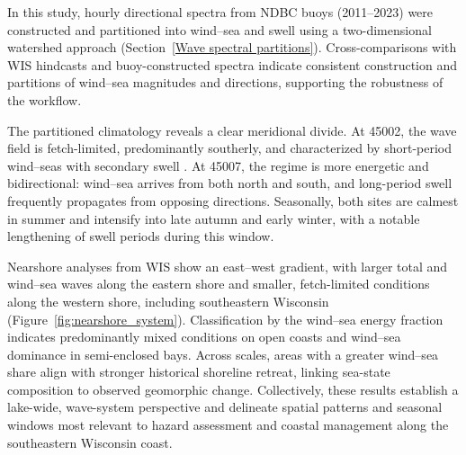 In this study, hourly directional spectra from NDBC buoys (2011–2023) were
constructed and partitioned into wind–sea and swell using a two-dimensional
watershed approach (Section~\ref{Wave spectral partitions}). Cross-comparisons
with WIS hindcasts and buoy-constructed spectra indicate consistent construction
and partitions of wind–sea magnitudes and directions, supporting the robustness
of the workflow.

The partitioned climatology reveals a clear meridional divide. At 45002, the
wave field is fetch-limited, predominantly southerly, and characterized by
short-period wind–seas with secondary swell . At 45007, the regime is more energetic and
bidirectional: wind–sea arrives from both north and south, and long-period swell
frequently propagates from opposing directions. Seasonally,
both sites are calmest in summer and intensify into late autumn and early
winter, with a notable lengthening of swell periods during this window.

Nearshore analyses from WIS show an east–west gradient, with larger total and
wind–sea waves along the eastern shore and smaller, fetch-limited conditions
along the western shore, including southeastern Wisconsin
(Figure~\ref{fig:nearshore_system}). Classification by the wind–sea energy
fraction indicates predominantly mixed conditions on open coasts and wind–sea
dominance in semi-enclosed bays. Across scales, areas with a greater wind–sea
share align with stronger historical shoreline retreat, linking sea-state
composition to observed geomorphic change. Collectively, these results establish
a lake-wide, wave-system perspective and delineate spatial patterns and seasonal
windows most relevant to hazard assessment and coastal management along the
southeastern Wisconsin coast.

